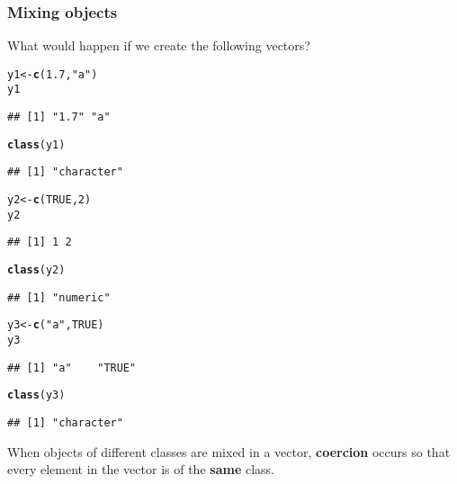 \documentclass[10pt,a4paper,twoside]{article}\usepackage[]{graphicx}\usepackage[]{xcolor}
\makeatletter
\newcommand{\hlnum}[1]{\textcolor[rgb]{0.686,0.059,0.569}{#1}}%
\newcommand{\hlsng}[1]{\textcolor[rgb]{0.192,0.494,0.8}{#1}}%
\newcommand{\hldef}[1]{\textcolor[rgb]{0.345,0.345,0.345}{#1}}%
\newcommand{\hlkwb}[1]{\textcolor[rgb]{0.69,0.353,0.396}{#1}}%
\newcommand{\hlkwd}[1]{\textcolor[rgb]{0.737,0.353,0.396}{\textbf{#1}}}%
\newenvironment{kframe}{%
 \def\at@end@of@kframe{}%
 \ifinner\ifhmode%
  \def\at@end@of@kframe{\end{minipage}}%
  \begin{minipage}{\columnwidth}%
 \fi\fi%
 \def\FrameCommand##1{\hskip\@totalleftmargin \hskip-\fboxsep
 \colorbox{shadecolor}{##1}\hskip-\fboxsep
     \hskip-\linewidth \hskip-\@totalleftmargin \hskip\columnwidth}%
 \MakeFramed {\advance\hsize-\width
   \@totalleftmargin\z@ \linewidth\hsize
   \@setminipage}}%
 {\par\unskip\endMakeFramed%
 \at@end@of@kframe}
\newenvironment{knitrout}{}{} %
\makeatother
\begin{document}
\subsubsection{Mixing objects}

What would happen if we create the following vectors?

\begin{knitrout}
\color{fgcolor}\begin{kframe}
\begin{alltt}
\hldef{y1} \hlkwb{<-} \hlkwd{c}\hldef{(}\hlnum{1.7}\hldef{,} \hlsng{"a"}\hldef{)}
\hldef{y1}
\end{alltt}
\begin{verbatim}
## [1] "1.7" "a"
\end{verbatim}
\begin{alltt}
\hlkwd{class}\hldef{(y1)}
\end{alltt}
\begin{verbatim}
## [1] "character"
\end{verbatim}
\begin{alltt}
\hldef{y2} \hlkwb{<-} \hlkwd{c}\hldef{(}\hlnum{TRUE}\hldef{,} \hlnum{2}\hldef{)}
\hldef{y2}
\end{alltt}
\begin{verbatim}
## [1] 1 2
\end{verbatim}
\begin{alltt}
\hlkwd{class}\hldef{(y2)}
\end{alltt}
\begin{verbatim}
## [1] "numeric"
\end{verbatim}
\begin{alltt}
\hldef{y3} \hlkwb{<-} \hlkwd{c}\hldef{(}\hlsng{"a"}\hldef{,} \hlnum{TRUE}\hldef{)}
\hldef{y3}
\end{alltt}
\begin{verbatim}
## [1] "a"    "TRUE"
\end{verbatim}
\begin{alltt}
\hlkwd{class}\hldef{(y3)}
\end{alltt}
\begin{verbatim}
## [1] "character"
\end{verbatim}
\end{kframe}
\end{knitrout}

When objects of different classes are mixed in a vector, \textbf{coercion} occurs so that every element in the vector is of the \textbf{same} class.
\end{document}
